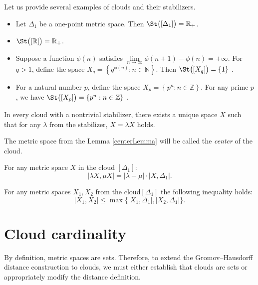 \documentclass[leqno]{article}
\begin{document}
Let us provide several examples of clouds and their stabilizers.

\begin{itemize}
    \item Let $\Delta_1$ be a one-point metric space. Then $\St\bigl([\Delta_1]\bigr) = \mathbb{R}_+$.
    \item $\St\bigl([\mathbb{R}]\bigr) = \mathbb{R}_+$.
    \item Suppose a function $\phi(n)$ satisfies $\lim\limits_{n \rightarrow \infty} \phi(n + 1) - \phi(n) = +\infty$. For $q > 1$, define the space $X_q = \left\{q^{\phi(n)}: n \in \mathbb{N}\right\}$. Then $\St\bigl([X_q]\bigr) = \{1\}$ \cite{TuzhBog1}.
    \item For a natural number $p$, define the space $X_p = \left\{p^n : n \in \mathbb{Z}\right\}$. For any prime $p$, we have $\St\bigl([X_p]\bigr) = \left\{p^n : n \in \mathbb{Z}\right\}$ \cite{BogBog1}.
\end{itemize}

\begin{lemma}
    In every cloud with a nontrivial stabilizer, there exists a unique space $X$ such that for any $\lambda$ from the stabilizer, $X = \lambda X$ holds.
    \label{centerLemma}
\end{lemma}

\begin{defin}
	The metric space from the Lemma \ref{centerLemma} will be called the \emph{center} of the cloud.
\end{defin}
\begin{remark} For any metric space $X$ in the cloud $[\Delta_1]$:
	$$|\lambda X, \mu X| = |\lambda - \mu|\cdot|X,\Delta_1|.$$
\end{remark} \begin{remark} For any metric spaces $X_{1}, X_{2}$ from the cloud$[\Delta_{1}]$ the following inequality holds:
	$$|X_{1},X_{2}| \le \max\{|X_{1}, \Delta_{1}|,|X_{2},\Delta_{1}|\}.$$
	\label{remUltraMetric}
\end{remark}
\section{Cloud cardinality}

By definition, metric spaces are sets. Therefore, to extend the Gromov--Hausdorff distance construction to clouds, we must either establish that clouds are sets or appropriately modify the distance definition.
\end{document}
